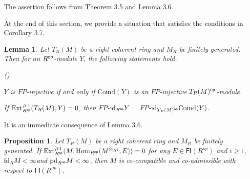 \documentclass[10pt,twoside]{amsart}
\theoremstyle{bfupright head,slanted body}
\theoremstyle{bfupright head,upright body}
\theoremstyle{fixed bf head,slanted body}
\newtheorem{prp}[res]{Proposition}      \newtheorem*{prp*}{Proposition}
\newtheorem{lem}[res]{Lemma}            \newtheorem*{lem*}{Lemma}
\theoremstyle{fixed bf head,upright body}
\theoremstyle{numbered paragraph}
\newlength{\thmlistleft}        %
\newlength{\thmlistright}       %
\newlength{\thmlistpartopsep}   %
\newlength{\thmlisttopsep}      %
\newlength{\thmlistparsep}      %
\newlength{\thmlistitemsep}     %
\newcounter{prt}
\newenvironment{prt}{\begin{list}{\upshape (\alph{prt})}%
    {\usecounter{prt}%
      \setlength{\leftmargin}{\thmlistleft}%
      \setlength{\labelwidth}{\thmlistleft}%
      \setlength{\rightmargin}{\thmlistright}%
      \setlength{\partopsep}{\thmlistpartopsep}%
      \setlength{\topsep}{\thmlisttopsep}%
      \setlength{\parsep}{\thmlistparsep}%
      \setlength{\itemsep}{\thmlistitemsep}}}%
  {\end{list}}%
\newenvironment{prf*}[1][Proof]{%
  \begin{proof}[\bf #1]
    \setcounter{equation}{0}
    \renewcommand{\theequation}{\arabic{equation}}}
  {\end{proof}
}
\numberwithin{equation}{res}
\newcommand{\id}{\mathrm{id}}
\newcommand{\fd}{\mathrm{fd}}
\newcommand{\pd}{\mathrm{pd}}
\newcommand{\FI}{\mathsf{FI}}
\newcommand{\Coind}{\mathrm{Coind}}
\newcommand{\Rop}{R^{\sf op}}
\newcommand{\op}{\sf op}
\newcommand{\Hom}{\operatorname{Hom}}
\newcommand{\Ext}{\operatorname{Ext}}
\begin{document}
\begin{prf*}
The assertion follows from Theorem 3.5 and Lemma 3.6.
\end{prf*}


At the end of this section, we provide a situation that satisfies the conditions in Corollary 3.7.

\begin{lem} \label{Inj of Ind-}
Let $T_R(M)$ be a right coherent ring and $M_{R}$ be finitely generated.
Then for an $\Rop$-module $Y$, the following statements hold.
\begin{prt}
\item $Y$ is $FP$-injective if and only if $\Coind(Y)$ is an $FP$-injective $T_R(M)^{\op}$-module.
\item If $\Ext^{\geqslant 1}_{\Rop}(T_R(M),Y)=0$, then $FP$-$\id_{\Rop}Y=$ $FP$-$\id_{T_R(M)^{\op}}\Coind(Y)$.
\end{prt}
\end{lem}
 
 \begin{prf*}
It is an immediate consequence of Lemma 3.6.
\end{prf*}

\begin{prp} \label{example of coadmissible and cocompatible}
Let $T_R(M)$ be a right coherent ring and $M_{R}$ be finitely generated.
If $\Ext_{\Rop}^{\geqslant 1}(M, \Hom_{\Rop}(M^{\otimes_Ri}, E))=0$ for any $E\in\FI(R^{op})$ and $i\geqslant 1$,
$\fd_{R}M<\infty$and $\pd_{\Rop}M<\infty$,
then $M$ is co-compatible and co-admissible  with respect to $\FI(R^{op})$.
\end{prp}
\end{document}
